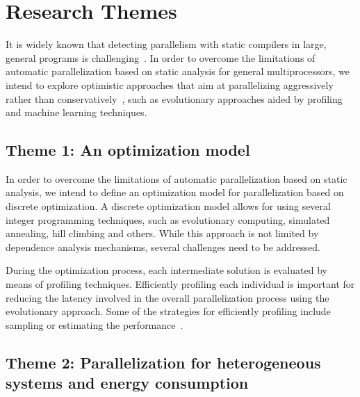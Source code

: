 \documentclass[a4paper,12pt]{article}
\newcommand\FIXME[1]{\textcolor{red}{FIX:}\textcolor{red}{#1}}
\begin{document}
\section{Research Themes}\label{sec:research-dir}


It is widely known that detecting parallelism with static compilers in large,
general programs is challenging~\cite{kennedy01,chen03}.  In order to overcome
the limitations of automatic parallelization based on static analysis for
general multiprocessors, we intend to explore optimistic approaches that aim at
parallelizing aggressively rather than
conservatively~\cite{chen03,williams96,williams99}, such as evolutionary
approaches aided by profiling and machine learning techniques. 


\subsection{Theme 1: An optimization model}

In order to overcome the limitations of automatic parallelization based on
static analysis, we intend to define an optimization model for parallelization
based on discrete optimization. A discrete optimization model allows for using
several integer programming techniques, such as evolutionary computing,
simulated annealing, hill climbing and others.  While this
approach is not limited by dependence analysis mechanisms, several challenges
need to be addressed.

During the optimization process, each intermediate solution is evaluated by
means of profiling techniques.  Efficiently profiling each individual is
important for reducing the latency involved in the overall parallelization
process using the evolutionary approach.  Some of the strategies for
efficiently profiling include sampling or estimating the
performance~\cite{douskos11,misailovic11,zhu12,fahringer95b,fahringer00,fahringer11}.

\subsection{Theme 2: Parallelization for heterogeneous systems and energy
consumption}
\end{document}
